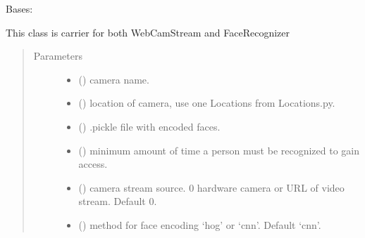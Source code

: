 \documentclass[letterpaper,10pt,english]{sphinxmanual}
\begin{document}
\begin{fulllineitems}
\label{\detokenize{doc/VideoStream/CameraAndFaceRecognizerCarrier:CameraAndFaceRecognizerCarrier.CameraAndFaceRecognizerCarrier}}
Bases: 

This class is carrier for both WebCamStream and FaceRecognizer
\begin{quote}\begin{description}
\item[{Parameters}] \leavevmode\begin{itemize}
\item {} 
 () \textendash{} camera name.

\item {} 
 () \textendash{} location of camera, use one Locations from Locations.py.

\item {} 
 () \textendash{} .pickle file with encoded faces.

\item {} 
 () \textendash{} minimum amount of time a person must be recognized to gain access.

\item {} 
 () \textendash{} camera stream source. 0 \sphinxhyphen{} hardware camera or URL of video stream. Default 0.

\item {} 
 () \textendash{} method for face encoding ‘hog’ or ‘cnn’. Default ‘cnn’.


\end{itemize}
\end{description}
\end{quote}
\end{fulllineitems}
\end{document}
